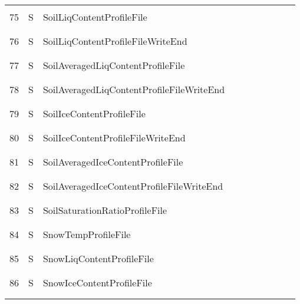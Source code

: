 \begin{longtable}{|c|c|l|c|c|c|c|p{}|c|p{}|}
&&&&&&&&&\\\hline%
&&&&&&&&&\\
75 & S & SoilLiqContentProfileFile & & & & & & & \\
&&&&&&&&&\\\hline%
&&&&&&&&&\\
76 & S & SoilLiqContentProfileFileWriteEnd & & & & & & & \\
&&&&&&&&&\\\hline%
&&&&&&&&&\\
77 & S & SoilAveragedLiqContentProfileFile & & & & & & & \\
&&&&&&&&&\\\hline%
&&&&&&&&&\\
78 & S & SoilAveragedLiqContentProfileFileWriteEnd & & & & & & & \\
&&&&&&&&&\\\hline%
&&&&&&&&&\\
79 & S & SoilIceContentProfileFile & & & & & & & \\
&&&&&&&&&\\\hline%
&&&&&&&&&\\
80 & S & SoilIceContentProfileFileWriteEnd & & & & & & & \\
&&&&&&&&&\\\hline%
&&&&&&&&&\\
81 & S & SoilAveragedIceContentProfileFile & & & & & & & \\
&&&&&&&&&\\\hline%
&&&&&&&&&\\
82 & S & SoilAveragedIceContentProfileFileWriteEnd & & & & & & & \\
&&&&&&&&&\\\hline%
&&&&&&&&&\\
83 & S & SoilSaturationRatioProfileFile & & & & & & & \\
&&&&&&&&&\\\hline%
&&&&&&&&&\\
84 & S & SnowTempProfileFile & & & & & & & \\
&&&&&&&&&\\\hline%
&&&&&&&&&\\
85 & S & SnowLiqContentProfileFile & & & & & & & \\
&&&&&&&&&\\\hline%
&&&&&&&&&\\
86 & S & SnowIceContentProfileFile & & & & & & & \\
&&&&&&&&&\\\hline%
&&&&&&&&&\\

\end{longtable}
